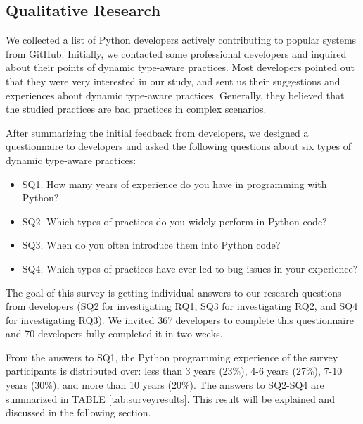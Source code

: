 \subsection{Qualitative Research}
We collected a list of Python developers actively contributing to popular systems from GitHub. Initially, we contacted some professional developers and inquired about their points of dynamic type-aware practices. Most developers pointed out that they were very interested in our study, and sent us their suggestions and experiences about dynamic type-aware practices. Generally, they believed that the studied practices are bad practices in complex scenarios.

After summarizing the initial feedback from developers,  we designed a questionnaire to developers and asked the following questions about six types of dynamic type-aware practices:
\begin{itemize}
	\item 
SQ1. How many years of experience do you have in programming with Python?
	\item 
SQ2. Which types of practices do you widely perform in Python code?
	\item 
SQ3. When do you often introduce them into Python code?
	\item 
SQ4. Which types of practices have ever led to bug issues in your experience?
\end{itemize}

The goal of this survey is getting individual answers to our research questions from developers (SQ2 for investigating RQ1, SQ3 for investigating RQ2, and SQ4 for investigating RQ3).
We invited 367 developers to complete this questionnaire and 70 developers fully completed it in two weeks. 

From the answers to SQ1, the Python programming experience of the survey participants is distributed over: less than 3 years (23\%), 4-6 years (27\%), 7-10 years (30\%), and more than 10 years (20\%). The answers to SQ2-SQ4 are summarized in TABLE \ref{tab:surveyresults}. This result will be explained and discussed in the following section.






